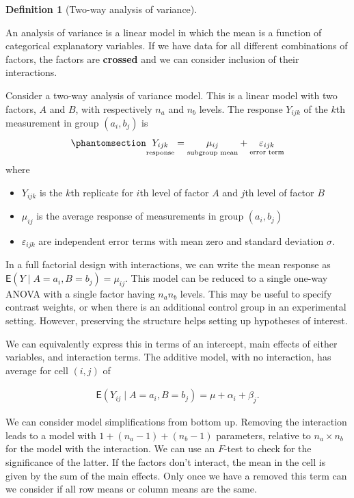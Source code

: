 \documentclass[
  11pt,
  letterpaper,
]{scrbook}
\providecommand{\tightlist}{%
  \setlength{\itemsep}{0pt}\setlength{\parskip}{0pt}}\usepackage{longtable,booktabs,array}
\theoremstyle{definition}
\newtheorem{definition}{Definition}[chapter]
\theoremstyle{definition}
\theoremstyle{plain}
\theoremstyle{plain}
\theoremstyle{remark}
\begin{document}
\begin{definition}[Two-way analysis of
variance]\protect\hypertarget{def-anova}{}\label{def-anova}

An analysis of variance is a linear model in which the mean is a
function of categorical explanatory variables. If we have data for all
different combinations of factors, the factors are \textbf{crossed} and
we can consider inclusion of their interactions.

Consider a two-way analysis of variance model. This is a linear model
with two factors, \(A\) and \(B\), with respectively \(n_a\) and \(n_b\)
levels. The response \(Y_{ijk}\) of the \(k\)th measurement in group
\((a_i, b_j)\) is
\begin{equation}\phantomsection\label{eq-twowayasoneway}{
\underset{\text{response}\vphantom{b}}{Y_{ijk}} = \underset{\text{subgroup mean}}{\mu_{ij}} + \underset{\text{error term}}{\varepsilon_{ijk}}
}\end{equation} where

\begin{itemize}
\tightlist
\item
  \(Y_{ijk}\) is the \(k\)th replicate for \(i\)th level of factor \(A\)
  and \(j\)th level of factor \(B\)
\item
  \(\mu_{ij}\) is the average response of measurements in group
  \((a_i, b_j)\)
\item
  \(\varepsilon_{ijk}\) are independent error terms with mean zero and
  standard deviation \(\sigma\).
\end{itemize}

In a full factorial design with interactions, we can write the mean
response as \(\mathsf{E}(Y \mid A=a_i, B=b_j) = \mu_{ij}\). This model
can be reduced to a single one-way ANOVA with a single factor having
\(n_an_b\) levels. This may be useful to specify contrast weights, or
when there is an additional control group in an experimental setting.
However, preserving the structure helps setting up hypotheses of
interest.

We can equivalently express this in terms of an intercept, main effects
of either variables, and interaction terms. The additive model, with no
interaction, has average for cell \((i,j)\) of

\begin{align*}
\mathsf{E}(Y_{ij} \mid A = a_i, B=b_j) = \mu + \alpha_i + \beta_j.
\end{align*}

We can consider model simplifications from bottom up. Removing the
interaction leads to a model with \(1 + (n_a-1) + (n_b-1)\) parameters,
relative to \(n_a\times n_b\) for the model with the interaction. We can
use an \(F\)-test to check for the significance of the latter. If the
factors don't interact, the mean in the cell is given by the sum of the
main effects. Only once we have a removed this term can we consider if
all row means or column means are the same.

\end{definition}
\end{document}
